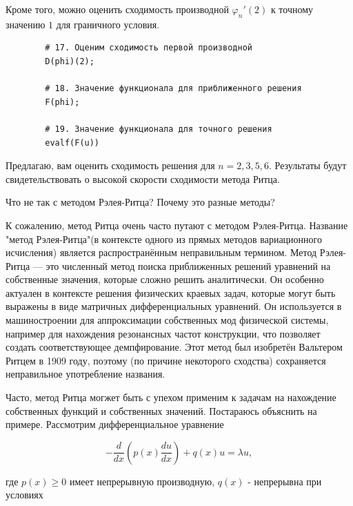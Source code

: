 \documentclass{article}
\begin{document}
\noindent Кроме того, можно оценить сходимость производной $\varphi_{n}'(2)$ к точному значению $1$ для граничного условия.

\begin{commandline}
	\begin{verbatim}
		# 17. Оценим сходимость первой производной
		D(phi)(2);

		# 18. Значение функционала для приближенного решения
		F(phi);

		# 19. Значение функционала для точного решения
		evalf(F(u))
	\end{verbatim}
\end{commandline}

\noindent Предлагаю, вам оценить сходимость решения для $n = 2, 3, 5, 6$. Результаты будут свидетельствовать о высокой скорости сходимости метода Ритца.

\newpage
\begin{question}
	Что не так с методом Рэлея-Ритца? Почему это разные методы?
\end{question}

\begin{warn}[Важно!]
	К сожалению, метод Ритца очень часто путают с методом Рэлея-Ритца. Название "метод Рэлея-Ритца"\;(в контексте одного из прямых методов вариационного исчисления) является распространённым неправильным термином. Метод Рэлея-Ритца --- это численный метод поиска приближенных решений уравнений на собственные значения, которые сложно решить аналитически. Он особенно актуален в контексте решения физических краевых задач, которые могут быть выражены в виде матричных дифференциальных уравнений. Он используется в машиностроении для аппроксимации собственных мод физической системы, например для нахождения резонансных частот конструкции, что позволяет создать соответствующее демпфирование. Этот метод был изобретён Вальтером Ритцем в 1909 году, поэтому (по причине некоторого сходства) сохраняется неправильное употребление названия.
\end{warn}

Часто, метод Ритца могжет быть с упехом применим к задачам на нахождение собственных функций и собственных значений. Постараюсь объяснить на примере. Рассмотрим дифференциальное уравнение

\begin{displaymath}
	- \frac{d}{dx} \left( p(x) \frac{du}{dx} \right) + q(x)u = \lambda u,
\end{displaymath}

\noindent где $p(x) \geq 0$ имеет непрерывную производную, $q(x)$ - непрерывна при условиях
\end{document}
